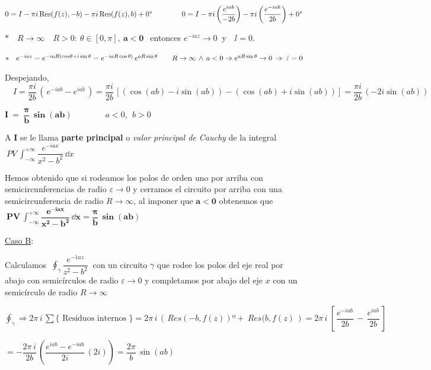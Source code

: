 $0=I-\pi i \Res(f(z),-b) -\pi i \Res(f(z),b) + 0^* \qquad \qquad 0 = I -\pi i \left( \dfrac{e^{iab}}{-2b} \right) -\pi i \left( \dfrac{e^{-iab}}{2b}  \right) + 0^*$

$ *  \quad R \to \infty \quad  R>0:\ \theta\in [0,\pi],\ \boldsymbol{a<0} \ \ $ entonces $e^{-iaz}\to 0\ $ y $\ $ \textcolor{green}{$I$}$=0$.

\textcolor{gris}{$*\quad  e^{-iaz}=e^{-iaR(cos\theta + i \sin \theta}=e^{-iaR\cos \theta)} \, e^{aR \sin \theta} \qquad R\to \infty \, \wedge \, a<0 \Rightarrow  e^{aR \sin \theta} \to 0 \, \Rightarrow \, \textcolor{green}{I}=0$}



Despejando, $\displaystyle \quad  I  = \dfrac{\pi i}{2b}\, (\, e^{-iab}-e^{iab} \,) = \dfrac{\pi i}{2b}\, [(\cos(ab)-i\sin(ab))-(\cos(ab)+i\sin(ab))] = \dfrac{\pi i}{2b}\, (-2i \sin(ab))$

$\boldsymbol{I\ = \ \dfrac \pi b \, \sin (ab)} \qquad \qquad a<0,\ \  b>0$




A $\boldsymbol I$ se le llama \textbf{parte principal} o \emph{valor principal de Cauchy} de la integral $\ \displaystyle PV\, \int_{-\infty}^{+\infty} \dfrac{e^{-iax}}{x^2-b^2}  \, \dd x$



Hemos obtenido que si rodeamos los polos de orden uno por arriba con semicircunferencias de radio $\varepsilon\to 0$ y cerramos el circuito por arriba con una semicircunferencia de radio $R\to \infty$, al imponer que $\boldsymbol{a<0}$ obtenemos que $\ \displaystyle \boldsymbol{ PV\, \int_{-\infty}^{+\infty} \dfrac{e^{-iax}}{x^2-b^2}  \, \dd x =  \dfrac \pi b \, \sin (ab) }$


\vspace{5mm}
	
\underline{Caso B}: 

Calculamos $\ \displaystyle \oint_\gamma \dfrac{e^{-1az}}{z^2-b^2}\ $ con un circuito $\gamma$ que rodee los polos del eje real por abajo con semicírculos de radio $\varepsilon \to 0$ y completamos por abajo del eje $x$ con un semicírculo de radio $R\to \infty$


$\displaystyle \oint_\gamma \Rightarrow 2\pi\, i \, \sum \{ \text{ Residuos internos } \} = 2\pi \, i \, \left( \, Res(-b,f(z))º + \ Res(b,f(z) \, \right) = 2\pi \, i \ \left[\,  \dfrac{e^{-iab}}{2b}\, - \,  \dfrac{e^{iab}}{2b} \, \right]$

$=\displaystyle -\dfrac{2\pi\, i}{2b} \, \left( \dfrac{e^{iab}-e^{-iab}}{2i}\, (2i) \right) = \dfrac {2\pi}b \, \sin(ab)$


